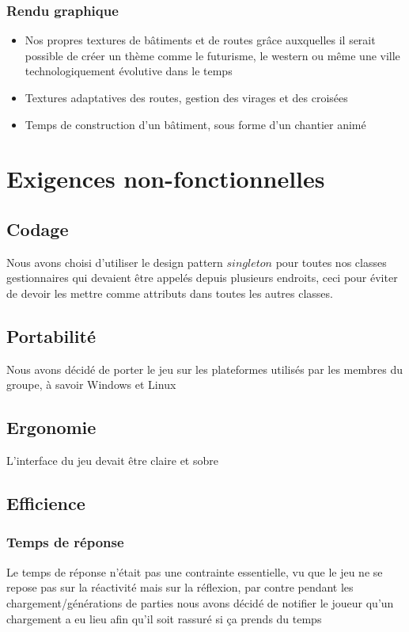 \documentclass[a4paper,10pt,openany,oneside]{report}
\begin{document}
\subsubsection{Rendu graphique}
\begin{itemize}
\item Nos propres textures de bâtiments et de routes grâce auxquelles il serait possible de créer un thème comme le futurisme, le western ou même une ville technologiquement évolutive dans le temps
\item Textures adaptatives des routes, gestion des virages et des croisées
\item Temps de construction d'un bâtiment, sous forme d'un chantier animé
\end{itemize}



\section{Exigences non-fonctionnelles}
\subsection{Codage}
Nous avons choisi d'utiliser le design pattern $singleton$ pour toutes nos classes gestionnaires qui devaient être appelés depuis plusieurs endroits, ceci pour éviter de devoir les mettre comme attributs dans toutes les autres classes.
\subsection{Portabilité}
Nous avons décidé de porter le jeu sur les plateformes utilisés par les membres du groupe, à savoir Windows et Linux
\subsection{Ergonomie}
L'interface du jeu devait être claire et sobre
\subsection{Efficience}
\subsubsection{Temps de réponse}
Le temps de réponse n'était pas une contrainte essentielle, vu que le jeu ne se repose pas sur la réactivité mais sur la réflexion, par contre pendant les chargement/générations de parties nous avons décidé de notifier le joueur qu'un chargement a eu lieu afin qu'il soit rassuré si ça prends du temps
\end{document}
